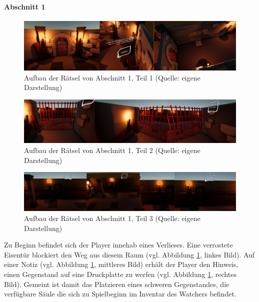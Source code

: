 \paragraph{Abschnitt 1}

\begin{figure}[ht]
\centering
\includegraphics[width=1\linewidth]{content/pictures/Rätseldesign - Abschnitt00 - Rätsel00.png}
\caption{Aufbau der Rätsel von Abschnitt 1, Teil 1 (Quelle: eigene Darstellung)}
\label{fig:riddle-design-section00-00}
\end{figure}

\begin{figure}[ht]
\centering
\includegraphics[width=1\linewidth]{content/pictures/Rätseldesign - Abschnitt00 - Rätsel01.png}
\caption{Aufbau der Rätsel von Abschnitt 1, Teil 2 (Quelle: eigene Darstellung)}
\label{fig:riddle-design-section00-01}
\end{figure}

\begin{figure}[ht]
\centering
\includegraphics[width=1\linewidth]{content/pictures/Rätseldesign - Abschnitt00 - Rätsel02.png}
\caption{Aufbau der Rätsel von Abschnitt 1, Teil 3 (Quelle: eigene Darstellung)}
\label{fig:riddle-design-section00-02}
\end{figure}

Zu Beginn befindet sich der Player innehab eines Verlieses. Eine verrostete Eisentür blockiert den Weg aus diesem Raum (vgl. Abbildung \ref{fig:riddle-design-section00-00}, linkes Bild). Auf einer Notiz (vgl. Abbildung \ref{fig:riddle-design-section00-00}, mittleres Bild) erhält der Player den Hinweis, einen Gegenstand auf eine Druckplatte zu werfen (vgl. Abbildung \ref{fig:riddle-design-section00-00}, rechtes Bild). Gemeint ist damit das Platzieren eines schweren Gegenstandes, die verfügbare Säule die sich zu Spielbeginn im Inventar des Watchers befindet.

